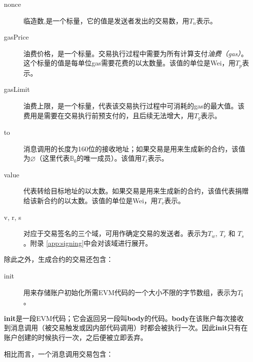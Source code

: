 \documentclass[UTF8,nofonts]{ctexart}
\begin{document}
\begin{multicols}{2}
\begin{description}
\item[nonce] 临造数,是一个标量，它的值是发送者发出的交易数，用$T_n$表示。
\item[gasPrice] 油费价格，是一个标量。交易执行过程中需要为所有计算支付\textit{油费（gas）}。这个标量的值是每单位gas需要花费的以太数量。该值的单位是Wei，用$T_p$表示。
\item[gasLimit] 油费上限，是一个标量，代表该交易执行过程中可消耗的gas的最大值。该费用是需要在交易执行前预支付的，且后续无法增大，用$T_g$表示。
\item[to] 消息调用的长度为160位的接收地址；如果交易是用来生成新的合约，该值为$\varnothing$（这里代表$\mathbb{B}_0$的唯一成员）。该值用$T_t$表示。
\item[value]代表转给目标地址的以太数。如果交易是用来生成新的合约，该值代表捐赠给该新合约的以太数。该值的单位是Wei，用$T_v$表示。
\item[v, r, s] 对应于交易签名的三个域，可用作确定交易的发送者。表示为$T_w$, $T_r$ 和 $T_s$。附录 \ref{app:signing}中会对该域进行展开。
\end{description}

除此之外，生成合约的交易还包含：

\begin{description}
\item[init] 用来存储账户初始化所需EVM代码的一个大小不限的字节数组，表示为$T_\mathbf{i}$。
\end{description}

\textbf{init}是一段EVM代码；它会返回另一段叫\textbf{body}的代码。\textbf{body}在该账户每次接收到消息调用（被交易触发或因内部代码调用）时都会被执行一次。因此\textbf{init}只有在账户创建的时候执行一次，之后便被立即丢弃。

相比而言，一个消息调用交易包含：


\end{multicols}
\end{document}
